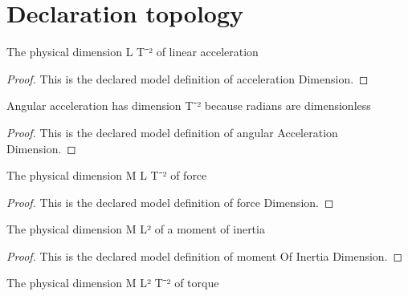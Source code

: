 \section{Declaration topology}
\begin{definition}
  \label{def:physics:phyx-mini-0784:phyxminiproblems-problemphyxmini0784-accelerationdimension}
  The physical dimension L T⁻² of linear acceleration
\end{definition}
\begin{proof}
  This is the declared model definition of acceleration Dimension.
\end{proof}
\begin{definition}
  \label{def:physics:phyx-mini-0784:phyxminiproblems-problemphyxmini0784-angularaccelerationdimension}
  Angular acceleration has dimension T⁻² because radians are dimensionless
\end{definition}
\begin{proof}
  This is the declared model definition of angular Acceleration Dimension.
\end{proof}
\begin{definition}
  \label{def:physics:phyx-mini-0784:phyxminiproblems-problemphyxmini0784-forcedimension}
  The physical dimension M L T⁻² of force
\end{definition}
\begin{proof}
  This is the declared model definition of force Dimension.
\end{proof}
\begin{definition}
  \label{def:physics:phyx-mini-0784:phyxminiproblems-problemphyxmini0784-momentofinertiadimension}
  The physical dimension M L² of a moment of inertia
\end{definition}
\begin{proof}
  This is the declared model definition of moment Of Inertia Dimension.
\end{proof}
\begin{definition}
  \label{def:physics:phyx-mini-0784:phyxminiproblems-problemphyxmini0784-torquedimension}
  The physical dimension M L² T⁻² of torque
\end{definition}
